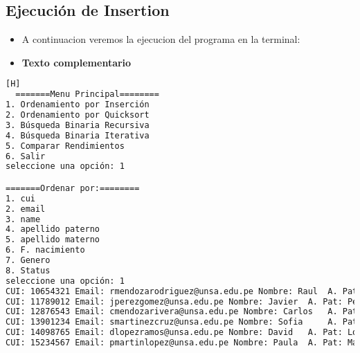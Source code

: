 \subsection{Ejecución de Insertion}
\begin{itemize}
  \item A continuacion veremos la ejecucion del programa en la terminal:
  \item \textbf{Texto complementario}
  \end{itemize}
   	\begin{lstlisting}[language=bash,caption={Compilación y ejecución del código}][H]
  =======Menu Principal========
1. Ordenamiento por Inserción
2. Ordenamiento por Quicksort
3. Búsqueda Binaria Recursiva
4. Búsqueda Binaria Iterativa
5. Comparar Rendimientos
6. Salir
seleccione una opción: 1

=======Ordenar por:========
1. cui
2. email
3. name
4. apellido paterno
5. apellido materno
6. F. nacimiento
7. Genero
8. Status
seleccione una opción: 1
CUI: 10654321 Email: rmendozarodriguez@unsa.edu.pe Nombre: Raul	 A. Pat: Mendoza A. Mat: Rodriguez Fecha de Nacimiento: 1992-08-07 Genero: 0 Estado: 1
CUI: 11789012 Email: jperezgomez@unsa.edu.pe Nombre: Javier	 A. Pat: Perez A. Mat: Gomez Fecha de Nacimiento: 1990-12-30 Genero: 0 Estado: 1
CUI: 12876543 Email: cmendozarivera@unsa.edu.pe Nombre: Carlos	 A. Pat: Mendoza A. Mat: Rivera Fecha de Nacimiento: 1991-03-05 Genero: 0 Estado: 1
CUI: 13901234 Email: smartinezcruz@unsa.edu.pe Nombre: Sofia	 A. Pat: Martinez A. Mat: Cruz Fecha de Nacimiento: 1994-05-18 Genero: 0 Estado: 1
CUI: 14098765 Email: dlopezramos@unsa.edu.pe Nombre: David	 A. Pat: Lopez A. Mat: Ramos Fecha de Nacimiento: 1993-09-23 Genero: 0 Estado: 1
CUI: 15234567 Email: pmartinlopez@unsa.edu.pe Nombre: Paula	 A. Pat: Martin A. Mat: Lopez Fecha de Nacimiento: 1995-11-11 Genero: 0 Estado: 1

  \end{lstlisting}
